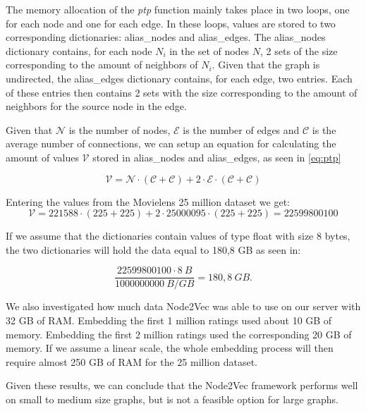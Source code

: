 The memory allocation of the \textit{ptp} function mainly takes place in two loops, one for each node and one for each edge.
In these loops, values are stored to two corresponding dictionaries: alias\_nodes and alias\_edges.
The alias\_nodes dictionary contains, for each node $N_i$ in the set of nodes $N$, 2 sets of the size corresponding to the amount of neighbors of $N_i$.
Given that the graph is undirected, the alias\_edges dictionary contains, for each edge, two entries. Each of these entries then contains 2 sets with the size corresponding to the amount of neighbors for the source node in the edge.

Given that $\mathcal{N}$ is the number of nodes, $\mathcal{E}$ is the number of edges and $\mathcal{C}$ is the average number of connections, we can setup an equation for calculating the amount of values $\mathcal{V}$ stored in alias\_nodes and alias\_edges, as seen in \autoref{eq:ptp}

\begin{equation}
  \label{eq:ptp}
  \mathcal{V} = \mathcal{N} \cdot (\mathcal{C} + \mathcal{C}) + 2 \cdot \mathcal{E} \cdot (\mathcal{C} + \mathcal{C})
\end{equation}

Entering the values from the Movielens 25 million dataset we get:
$$
\mathcal{V} = 221588 \cdot (225 + 225) + 2 \cdot 25000095 \cdot (225 + 225) = 22599800100
$$


If we assume that the dictionaries contain values of type float with size 8 bytes, the two dictionaries will hold the data equal to 180,8 GB as seen in:

$$
  \frac{22599800100 \cdot 8 \ B}{1000000000 \ B/GB} = 180,8 \ GB.
$$

We also investigated how much data Node2Vec was able to use on our server with 32 GB of RAM. Embedding the first 1 million ratings used about 10 GB of memory. Embedding the first 2 million ratings used the corresponding 20 GB of memory. If we assume a linear scale, the whole embedding process will then require almost 250 GB of RAM for the 25 million dataset.

Given these results, we can conclude that the Node2Vec framework performs well on small to medium size graphs, but is not a feasible option for large graphs.


